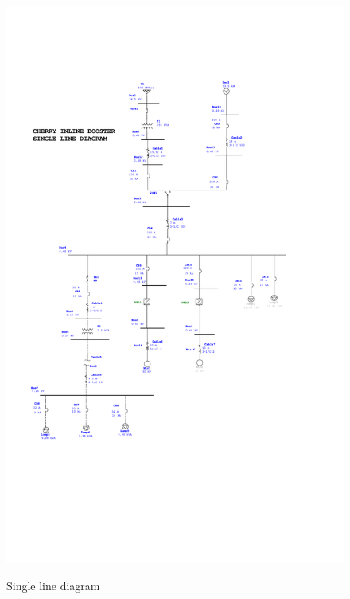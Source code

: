 \begin{figure}[!htb]
	\includegraphics[width=\textwidth]{figures/che_SLD_with_VFD.pdf} \\
	\caption{Single line diagram}
	\label{fig_ch04_elecaudit_che_SLD_with_VFD} 
\end{figure}
